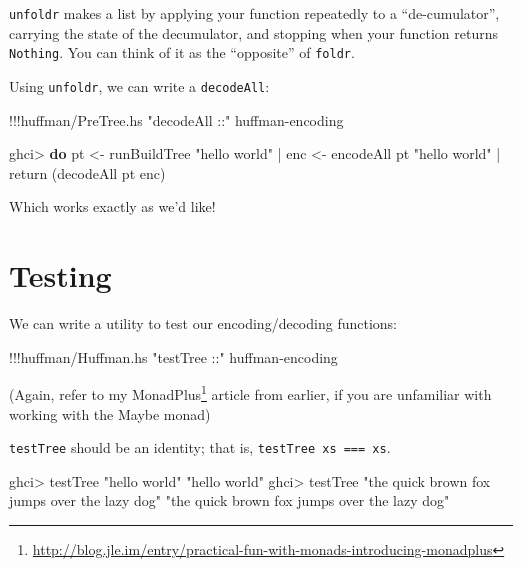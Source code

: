 \documentclass[]{article}
\newenvironment{Shaded}{}{}
\newcommand{\KeywordTok}[1]{\textcolor[rgb]{0.00,0.44,0.13}{\textbf{{#1}}}}
\newcommand{\StringTok}[1]{\textcolor[rgb]{0.25,0.44,0.63}{{#1}}}
\newcommand{\OtherTok}[1]{\textcolor[rgb]{0.00,0.44,0.13}{{#1}}}
\newcommand{\FunctionTok}[1]{\textcolor[rgb]{0.02,0.16,0.49}{{#1}}}
\newcommand{\NormalTok}[1]{{#1}}
\renewcommand{\href}[2]{#2\footnote{\url{#1}}}
\begin{document}
\texttt{unfoldr} makes a list by applying your function repeatedly to a
``de-cumulator'', carrying the state of the decumulator, and stopping
when your function returns \texttt{Nothing}. You can think of it as the
``opposite'' of \texttt{foldr}.

Using \texttt{unfoldr}, we can write a \texttt{decodeAll}:

\begin{Shaded}
\begin{Highlighting}[]
\FunctionTok{!!!}\NormalTok{huffman}\FunctionTok{/}\NormalTok{PreTree.hs }\StringTok{"decodeAll ::"} \NormalTok{huffman}\FunctionTok{-}\NormalTok{encoding}
\end{Highlighting}
\end{Shaded}

\begin{Shaded}
\begin{Highlighting}[]
\NormalTok{ghci}\FunctionTok{>} \KeywordTok{do} \NormalTok{pt  }\OtherTok{<-} \NormalTok{runBuildTree }\StringTok{"hello world"}
 \FunctionTok{|}    \NormalTok{enc }\OtherTok{<-} \NormalTok{encodeAll pt }\StringTok{"hello world"}
 \FunctionTok{|}    \NormalTok{return (decodeAll pt enc)}
\end{Highlighting}
\end{Shaded}

Which works exactly as we'd like!

\section{Testing}\label{testing}

We can write a utility to test our encoding/decoding functions:

\begin{Shaded}
\begin{Highlighting}[]
\FunctionTok{!!!}\NormalTok{huffman}\FunctionTok{/}\NormalTok{Huffman.hs }\StringTok{"testTree ::"} \NormalTok{huffman}\FunctionTok{-}\NormalTok{encoding}
\end{Highlighting}
\end{Shaded}

(Again, refer to my
\href{http://blog.jle.im/entry/practical-fun-with-monads-introducing-monadplus}{MonadPlus}
article from earlier, if you are unfamiliar with working with the Maybe
monad)

\texttt{testTree} should be an identity; that is,
\texttt{testTree\ xs\ ===\ xs}.

\begin{Shaded}
\begin{Highlighting}[]
\NormalTok{ghci}\FunctionTok{>} \NormalTok{testTree }\StringTok{"hello world"}
\StringTok{"hello world"}
\NormalTok{ghci}\FunctionTok{>} \NormalTok{testTree }\StringTok{"the quick brown fox jumps over the lazy dog"}
\StringTok{"the quick brown fox jumps over the lazy dog"}
\end{Highlighting}
\end{Shaded}
\end{document}
